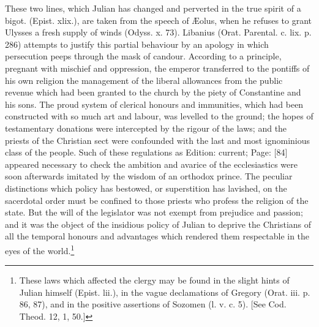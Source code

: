 {{}These two lines, which Julian has changed and perverted in the true spirit of a bigot. (Epist. xlix.), are taken from the speech of Æolus, when he refuses to grant Ulysses a fresh supply of winds (Odyss. x. 73). Libanius (Orat. Parental. c. lix. p. 286) attempts to justify this partial behaviour by an apology in which persecution peeps through the mask of candour.} According to a principle, pregnant with mischief and oppression, the emperor transferred to the pontiffs of his own religion the management of the liberal allowances from the public revenue which had been granted to the church by the piety of Constantine and his sons. The proud system of clerical honours and immunities, which had been constructed with so much art and labour, was levelled to the ground; the hopes of testamentary donations were intercepted by the rigour of the laws; and the priests of the Christian sect were confounded with the last and most ignominious class of the people. Such of these regulations as Edition: current; Page: [84] appeared necessary to check the ambition and avarice of the ecclesiastics were soon afterwards imitated by the wisdom of an orthodox prince. The peculiar distinctions which policy has bestowed, or superstition has lavished, on the sacerdotal order must be confined to those priests who profess the religion of the state. But the will of the legislator was not exempt from prejudice and passion; and it was the object of the insidious policy of Julian to deprive the Christians of all the temporal honours and advantages which rendered them respectable in the eyes of the world.\footnote{These laws which affected the clergy may be found in the slight hints of Julian himself (Epist. lii.), in the vague declamations of Gregory (Orat. iii. p. 86, 87), and in the positive assertions of Sozomen (l. v. c. 5). [See Cod. Theod. 12, 1, 50.]}

